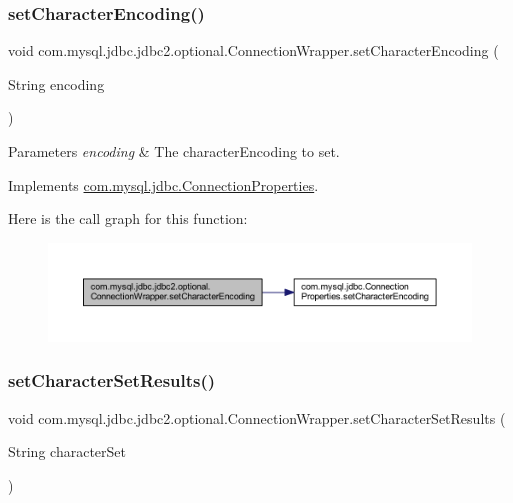 \subsubsection{\texorpdfstring{set\+Character\+Encoding()}{setCharacterEncoding()}}
{\footnotesize\ttfamily void com.\+mysql.\+jdbc.\+jdbc2.\+optional.\+Connection\+Wrapper.\+set\+Character\+Encoding (\begin{DoxyParamCaption}\item[{String}]{encoding }\end{DoxyParamCaption})}


\begin{DoxyParams}{Parameters}
{\em encoding} & The character\+Encoding to set. \\
\hline
\end{DoxyParams}


Implements \mbox{\hyperlink{interfacecom_1_1mysql_1_1jdbc_1_1_connection_properties_ac5db9f2921918f0a5d1f55ce5e093948}{com.\+mysql.\+jdbc.\+Connection\+Properties}}.

Here is the call graph for this function\+:
\nopagebreak
\begin{figure}[H]
\begin{center}
\leavevmode
\includegraphics[width=350pt]{classcom_1_1mysql_1_1jdbc_1_1jdbc2_1_1optional_1_1_connection_wrapper_a7f74453daef3b82cf585f58cb4c1e820_cgraph}
\end{center}
\end{figure}
\mbox{\label{classcom_1_1mysql_1_1jdbc_1_1jdbc2_1_1optional_1_1_connection_wrapper_a34e64b74d02a705c8a2e5e9d9c3f7503}} 
\subsubsection{\texorpdfstring{set\+Character\+Set\+Results()}{setCharacterSetResults()}}
{\footnotesize\ttfamily void com.\+mysql.\+jdbc.\+jdbc2.\+optional.\+Connection\+Wrapper.\+set\+Character\+Set\+Results (\begin{DoxyParamCaption}\item[{String}]{character\+Set }\end{DoxyParamCaption})}


